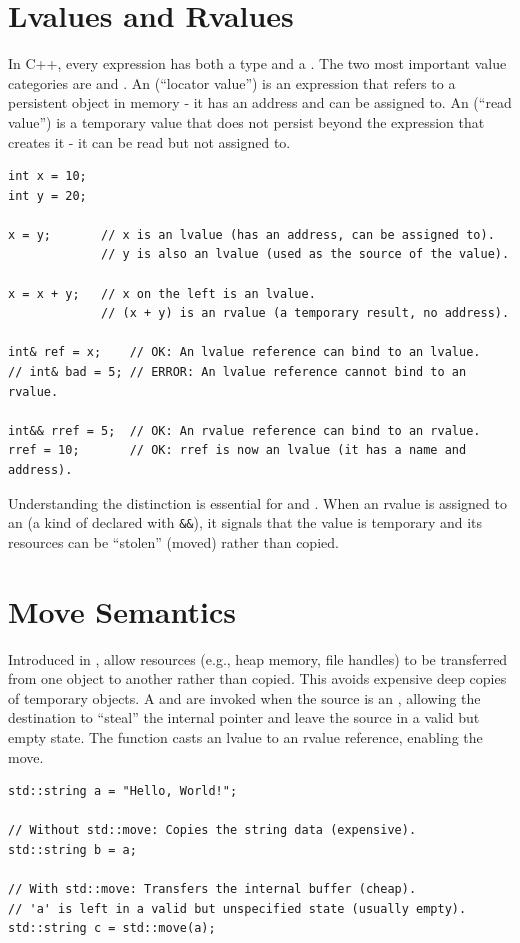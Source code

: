 \section{Lvalues and Rvalues}
In C++, every expression has both a type and a . The two most important value categories are  and . An  (``locator value'') is an expression that refers to a persistent object in memory - it has an address and can be assigned to. An  (``read value'') is a temporary value that does not persist beyond the expression that creates it - it can be read but not assigned to.
\begin{lstlisting}
int x = 10;
int y = 20;

x = y;       // x is an lvalue (has an address, can be assigned to).
             // y is also an lvalue (used as the source of the value).

x = x + y;   // x on the left is an lvalue.
             // (x + y) is an rvalue (a temporary result, no address).

int& ref = x;    // OK: An lvalue reference can bind to an lvalue.
// int& bad = 5; // ERROR: An lvalue reference cannot bind to an rvalue.

int&& rref = 5;  // OK: An rvalue reference can bind to an rvalue.
rref = 10;       // OK: rref is now an lvalue (it has a name and address).
\end{lstlisting}
Understanding the distinction is essential for  and . When an rvalue is assigned to an  (a kind of  declared with \texttt{\&\&}), it signals that the value is temporary and its resources can be ``stolen'' (moved) rather than copied.

\section{Move Semantics}
Introduced in ,  allow resources (e.g., heap memory, file handles) to be transferred from one object to another rather than copied. This avoids expensive deep copies of temporary objects. A  and  are invoked when the source is an , allowing the destination to ``steal'' the internal pointer and leave the source in a valid but empty state. The  function casts an lvalue to an rvalue reference, enabling the move.
\begin{lstlisting}
std::string a = "Hello, World!";

// Without std::move: Copies the string data (expensive).
std::string b = a;

// With std::move: Transfers the internal buffer (cheap).
// 'a' is left in a valid but unspecified state (usually empty).
std::string c = std::move(a);
\end{lstlisting}

